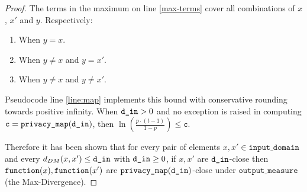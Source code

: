 \documentclass{article}
\begin{document}
\begin{proof}
The terms in the maximum on line \ref{max-terms} cover all combinations of $x$, $x'$ and $y$. Respectively: 
\begin{enumerate} 
    \item When $y = x$. 
    \item When $y \ne x$ and $y = x'$. 
    \item When $y \ne x$ and $y \ne x'$. 
\end{enumerate} 
 
Pseudocode line \ref{line:map} implements this bound with conservative rounding towards positive infinity.  
When $\texttt{d\_in} > 0$ and no exception is raised in computing $\texttt{c} = \texttt{privacy\_map}(\texttt{d\_in})$, then $\ln\left(\frac{p \cdot (t - 1)}{1 - p}\right) \leq \texttt{c}$.  
 
Therefore it has been shown that for every pair of elements $x, x' \in \texttt{input\_domain}$ and every $d_{DM}(x, x') \le \texttt{d\_in}$ with $\texttt{d\_in} \ge 0$,  
if $x, x'$ are $\texttt{d\_in}$-close then $\texttt{function}(x),\texttt{function}(x')$ are $\texttt{privacy\_map}(\texttt{d\_in})$-close under $\texttt{output\_measure}$ (the Max-Divergence). 
\end{proof} 
 
 
 
 
\end{document}
